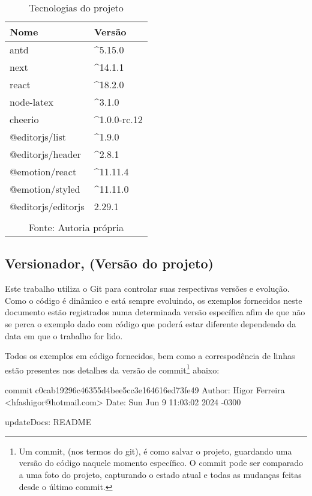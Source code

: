 \begin{table}[H]
    \centering
    \caption{Tecnologias do projeto}
    \label{tbl:tecnologias-projeto}
    \renewcommand{\arraystretch}{1.5}
    \begin{tabular}{p{3.2000cm} p{4.8000cm}}
        \hline
        \textbf{Nome} & \textbf{Versão} \\
        \hline
        antd & \textasciicircum 5.15.0 \\
		next & \textasciicircum 14.1.1 \\
		react & \textasciicircum 18.2.0 \\
		node-latex & \textasciicircum 3.1.0 \\
		cheerio & \textasciicircum 1.0.0-rc.12 \\
		@editorjs/list & \textasciicircum 1.9.0 \\
		@editorjs/header & \textasciicircum 2.8.1 \\
		@emotion/react & \textasciicircum 11.11.4 \\
		@emotion/styled & \textasciicircum 11.11.0 \\
		@editorjs/editorjs & 2.29.1 \\
        \hline
        \\\multicolumn{2}{c}{\fontsize{10pt}{12pt}Fonte: Autoria própria}
    \end{tabular}
\end{table}

\subsection{Versionador, (Versão do projeto)}

Este trabalho utiliza o Git para controlar suas respectivas versões e
evolução. Como o código é dinâmico e está sempre evoluindo,
os exemplos fornecidos neste documento estão registrados numa determinada
versão específica afim de que não se perca o exemplo dado com código que
poderá estar diferente dependendo da data em que o trabalho for lido.

Todos os exemplos em código fornecidos, bem como a correspodência de linhas
estão presentes nos detalhes da versão de
commit\footnote{Um commit, (nos termos do git), é como salvar o projeto, guardando uma versão do código naquele momento específico.
    O commit pode ser comparado a uma foto do projeto, capturando o estado atual e todas as mudanças feitas desde o último commit.
}
abaixo:

\begin{GitVersionCode}
commit c0cab19296c46355d4bee5cc3e164616ed73fe49
Author: Higor Ferreira <hfashigor@hotmail.com>
Date:   Sun Jun 9 11:03:02 2024 -0300

    updateDocs: README
\end{GitVersionCode}

